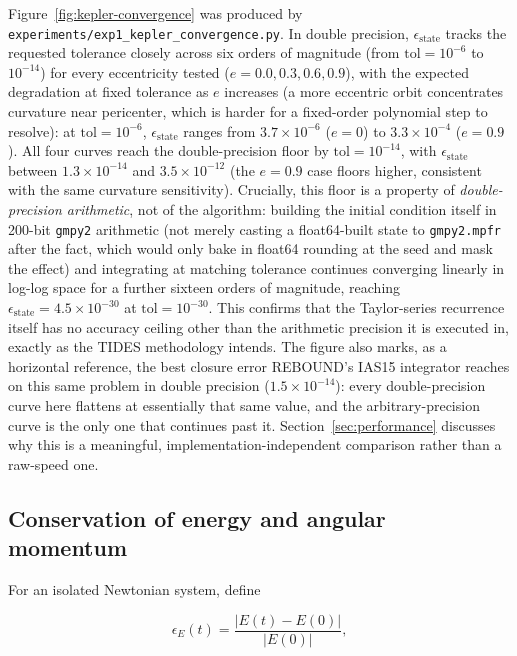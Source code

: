 \documentclass[11pt]{article}
\begin{document}
Figure~\ref{fig:kepler-convergence} was produced by
\texttt{experiments/exp1\_kepler\_convergence.py}. In double
precision, $\epsilon_{\mathrm{state}}$ tracks the requested tolerance closely
across six orders of magnitude (from $\mathrm{tol}=10^{-6}$ to $10^{-14}$) for
every eccentricity tested ($e=0.0,0.3,0.6,0.9$), with the expected
degradation at fixed tolerance as $e$ increases (a more eccentric orbit
concentrates curvature near pericenter, which is harder for a fixed-order
polynomial step to resolve): at $\mathrm{tol}=10^{-6}$, $\epsilon_{\mathrm{state}}$
ranges from $3.7\times10^{-6}$ ($e=0$) to $3.3\times10^{-4}$ ($e=0.9$). All
four curves reach the double-precision floor by $\mathrm{tol}=10^{-14}$, with
$\epsilon_{\mathrm{state}}$ between $1.3\times10^{-14}$ and $3.5\times10^{-12}$
(the $e=0.9$ case floors higher, consistent with the same curvature
sensitivity). Crucially, this floor is a property of \emph{double-precision
arithmetic}, not of the algorithm: building the initial condition itself in
200-bit \texttt{gmpy2} arithmetic (not merely casting a float64-built state to
\texttt{gmpy2.mpfr} after the fact, which would only bake in float64 rounding
at the seed and mask the effect) and integrating at matching tolerance
continues converging linearly in
log-log space for a further sixteen orders of magnitude, reaching
$\epsilon_{\mathrm{state}}=4.5\times10^{-30}$ at $\mathrm{tol}=10^{-30}$. This
confirms that the Taylor-series recurrence itself has no accuracy ceiling
other than the arithmetic precision it is executed in, exactly as the TIDES
methodology intends. The figure also marks, as a horizontal reference, the
best closure error REBOUND's IAS15 integrator reaches on this same problem
in double precision ($1.5\times10^{-14}$): every double-precision curve
here flattens at essentially that same value, and the arbitrary-precision
curve is the only one that continues past it. Section~\ref{sec:performance}
discusses why this is a meaningful, implementation-independent comparison
rather than a raw-speed one.


\subsection{Conservation of energy and angular momentum}

For an isolated Newtonian system, define

\begin{equation}
    \epsilon_E(t)
    =
    \frac{|E(t)-E(0)|}{|E(0)|},
\end{equation}
\end{document}
